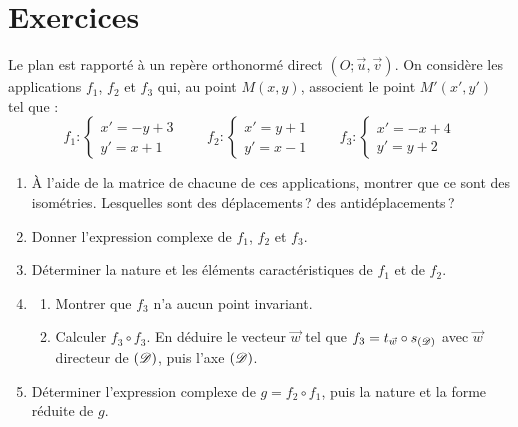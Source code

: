 \section{Exercices}
\begin{exo}\label{exo:isom-analytique}
      Le plan est rapporté à un repère orthonormé direct $(O;\vec{u},\vec{v})$.
      On considère les applications $f_1$, $f_2$ et $f_3$ qui, au point $M(x,y)$, associent le point $M'(x',y')$ tel que :
      \[
            f_1 : \left\lbrace \begin{array}{l} x' = -y + 3 \\ y' = x + 1 \end{array} \right.
            \qquad
            f_2 : \left\lbrace \begin{array}{l} x' = y + 1 \\ y' = x - 1 \end{array} \right.
            \qquad
            f_3 : \left\lbrace \begin{array}{l} x' = -x + 4 \\ y' = y + 2 \end{array} \right.
      \]
      \begin{enumerate}
            \item À l'aide de la matrice de chacune de ces applications, montrer que ce sont des isométries.
                  Lesquelles sont des déplacements\,? des antidéplacements\,?
            \item Donner l'expression complexe de $f_1$, $f_2$ et $f_3$.
            \item Déterminer la nature et les éléments caractéristiques de $f_1$ et de $f_2$.
            \item \begin{enumerate}
                        \item Montrer que $f_3$ n'a aucun point invariant.
                        \item Calculer $f_3 \circ f_3$. En déduire le vecteur $\vec{w}$ tel que $f_3 = t_{\vec{w}} \circ s_{(\mathscr{D})}$
                              avec $\vec{w}$ directeur de $(\mathscr{D})$, puis l'axe $(\mathscr{D})$.
                  \end{enumerate}
            \item Déterminer l'expression complexe de $g = f_2 \circ f_1$, puis la nature et la forme réduite de $g$.
      \end{enumerate}
\end{exo}
